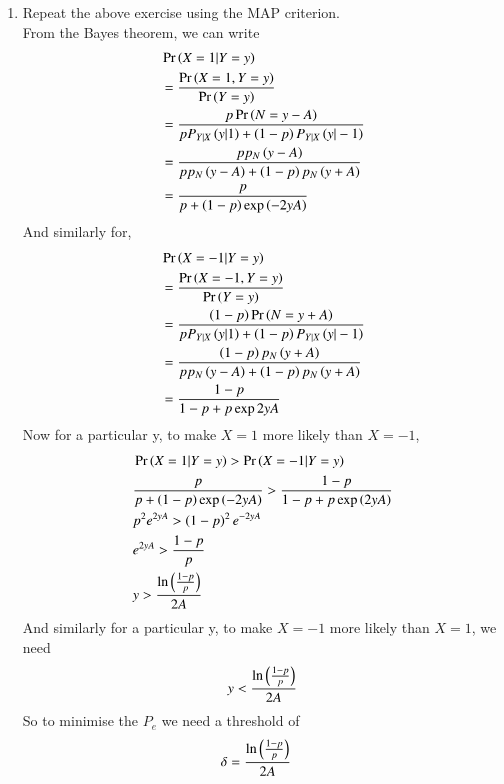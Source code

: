 \documentclass[journal,12pt,twocolumn]{IEEEtran}
\renewcommand\thesection{\arabic{section}}
\begin{document}
\begin{enumerate}[label=\thesection.\arabic*
,ref=\thesection.\theenumi]
\begin{enumerate}[label=\thesection.\arabic*
,ref=\thesection.\theenumi]
\item Repeat the above exercise using the MAP criterion.\\
  \solution From the Bayes theorem, we can write
       \begin{align}
	          &\Pr\left(X=1|Y=y\right)  \\
	          &= \frac{\Pr\left(X=1,Y=y\right)}{\Pr\left(Y=y\right)}\\
		      &= \frac{p\Pr\left(N = y -A\right)}{pP_{Y|X}\left(y|1\right) +\left(1-p\right)P_{Y|X}\left(y|-1\right)}\\
		      &= \frac{p p_{N}\left(y-A\right)}{pp_{N}\left(y-A\right) + \left(1-p\right)p_{N}\left(y+A\right)}\\
		      &= \frac{p}{p + \left(1-p\right)\exp\left(-2yA\right)}
       \end{align}
       And similarly for,
       \begin{align}
	          &\Pr\left(X=-1|Y=y\right) \\
	          &= \frac{\Pr\left(X=-1,Y=y\right)}{\Pr\left(Y=y\right)}\\
		      &= \frac{\left(1-p\right)\Pr\left(N = y +A\right)}{pP_{Y|X}\left(y|1\right) +\left(1-p\right)P_{Y|X}\left(y|-1\right)}\\
		      &= \frac{\left(1-p\right)p_{N}\left(y+A\right)}{pp_{N}\left(y-A\right) + \left(1-p\right)p_{N}\left(y+A\right)}\\
              &= \frac{1-p}{1-p+ p\exp{2yA}}
       \end{align}
       Now for a particular y, to make $X = 1$ more likely than $X= -1$,
        \begin{align}
	   &\Pr\left(X=1|Y=y\right) > \Pr\left(X=-1|Y=y\right)\\
	   &\frac{p}{p + \left(1-p\right)\exp\left(-2yA\right)} >\frac{1-p}{1-p+ p\exp\left(2yA\right)}\\
	   &p^2e^{2yA} > \left(1-p\right)^{2}e^{-2yA}\\
       &e^{2yA} >\frac{1-p}{p}\\
	   &y > \frac{\ln{\ensuremath{\left(\frac{1-p}{p}\right)}}}{2A}
	\end{align}
	And similarly for a particular y, to make $X=-1$ more likely than $X=1$, we need
	 \begin{align}
		 y < \frac{\ln{\ensuremath{\left(\frac{1-p}{p}\right)}}}{2A}
         \end{align}
	 So to minimise the $P_e$ we need a threshold of
	  \begin{align}
		  \delta &= \frac{\ln{\ensuremath{\left(\frac{1-p}{p}\right)}}}{2A}
          \end{align}		   
  \end{enumerate}

\end{enumerate}
\end{document}
